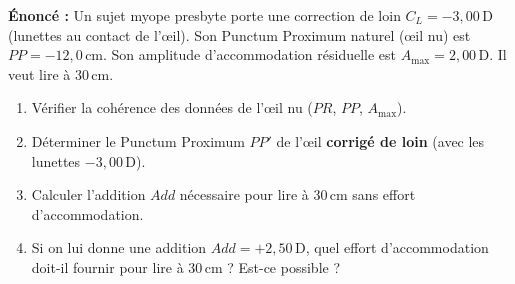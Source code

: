 \documentclass[11pt]{article}
\begin{document}
\begin{exoresolu}
\textbf{Énoncé :} Un sujet myope presbyte porte une correction de loin $C_L = -3,00\,\text{D}$ (lunettes au contact de l'œil). Son Punctum Proximum naturel (œil nu) est $PP = -12,0\,\text{cm}$. Son amplitude d'accommodation résiduelle est $A_{\text{max}} = 2,00\,\text{D}$. Il veut lire à $30\,\text{cm}$.
\begin{enumerate}
    \item Vérifier la cohérence des données de l'œil nu ($PR$, $PP$, $A_{\text{max}}$).
    \item Déterminer le Punctum Proximum $PP'$ de l'œil \textbf{corrigé de loin} (avec les lunettes $-3,00\,\text{D}$).
    \item Calculer l'addition $Add$ nécessaire pour lire à $30\,\text{cm}$ sans effort d'accommodation.
    \item Si on lui donne une addition $Add = +2,50\,\text{D}$, quel effort d'accommodation doit-il fournir pour lire à $30\,\text{cm}$ ? Est-ce possible ?
\end{enumerate}


\end{exoresolu}
\end{document}
